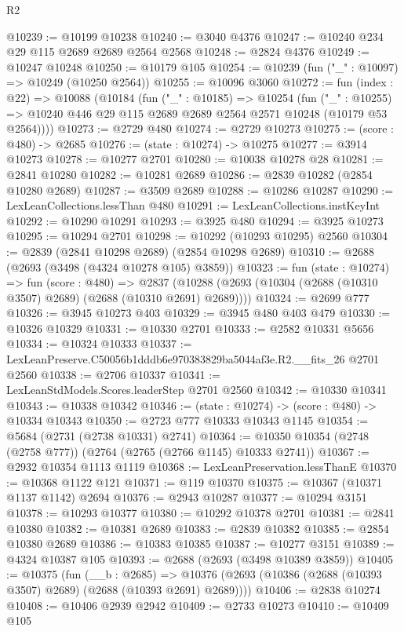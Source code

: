 \begin{lexlean}{R2}
\begin{coremodule}
@10239 := @10199 @10238
@10240 := @3040 @4376
@10247 := @10240 @234 @29 @115 @2689 @2689 @2564 @2568
@10248 := @2824 @4376
@10249 := @10247 @10248
@10250 := @10179 @105
@10254 := @10239 (fun ("_" : @10097) => @10249 (@10250 @2564))
@10255 := @10096 @3060
@10272 := fun (index : @22) =>
  @10088
    (@10184
      (fun ("_" : @10185) =>
      @10254
        (fun ("_" : @10255) =>
        @10240 @446 @29 @115 @2689 @2689 @2564 @2571 @10248 (@10179 @53 @2564))))
@10273 := @2729 @480
@10274 := @2729 @10273
@10275 := (score : @480) -> @2685
@10276 := (state : @10274) -> @10275
@10277 := @3914 @10273
@10278 := @10277 @2701
@10280 := @10038 @10278 @28
@10281 := @2841 @10280
@10282 := @10281 @2689
@10286 := @2839 @10282 (@2854 @10280 @2689)
@10287 := @3509 @2689
@10288 := @10286 @10287
@10290 := LexLeanCollections.lessThan @480
@10291 := LexLeanCollections.instKeyInt
@10292 := @10290 @10291
@10293 := @3925 @480
@10294 := @3925 @10273
@10295 := @10294 @2701
@10298 := @10292 (@10293 @10295) @2560
@10304 := @2839 (@2841 @10298 @2689) (@2854 @10298 @2689)
@10310 := @2688 (@2693 (@3498 (@4324 @10278 @105) @3859))
@10323 := fun (state : @10274) =>
  fun (score : @480) =>
  @2837 (@10288 (@2693 (@10304 (@2688 (@10310 @3507) @2689) (@2688 (@10310 @2691) @2689))))
@10324 := @2699 @777
@10326 := @3945 @10273 @403
@10329 := @3945 @480 @403 @479
@10330 := @10326 @10329
@10331 := @10330 @2701
@10333 := @2582 @10331 @5656
@10334 := @10324 @10333
@10337 := LexLeanPreserve.C50056b1dddb6e970383829ba5044af3e.R2.__fits_26 @2701 @2560
@10338 := @2706 @10337
@10341 := LexLeanStdModels.Scores.leaderStep @2701 @2560
@10342 := @10330 @10341
@10343 := @10338 @10342
@10346 := (state : @10274) -> (score : @480) -> @10334 @10343
@10350 := @2723 @777 @10333 @10343 @1145
@10354 := @5684 (@2731 (@2738 @10331) @2741)
@10364 := @10350 @10354 (@2748 (@2758 @777)) (@2764 (@2765 (@2766 @1145) @10333 @2741))
@10367 := @2932 @10354 @1113 @1119
@10368 := LexLeanPreservation.lessThanE
@10370 := @10368 @1122 @121
@10371 := @119 @10370
@10375 := @10367 (@10371 @1137 @1142) @2694
@10376 := @2943 @10287
@10377 := @10294 @3151
@10378 := @10293 @10377
@10380 := @10292 @10378 @2701
@10381 := @2841 @10380
@10382 := @10381 @2689
@10383 := @2839 @10382
@10385 := @2854 @10380 @2689
@10386 := @10383 @10385
@10387 := @10277 @3151
@10389 := @4324 @10387 @105
@10393 := @2688 (@2693 (@3498 @10389 @3859))
@10405 := @10375
    (fun (__b : @2685) =>
    @10376 (@2693 (@10386 (@2688 (@10393 @3507) @2689) (@2688 (@10393 @2691) @2689))))
@10406 := @2838 @10274
@10408 := @10406 @2939 @2942
@10409 := @2733 @10273
@10410 := @10409 @105

\end{coremodule}
\end{lexlean}
